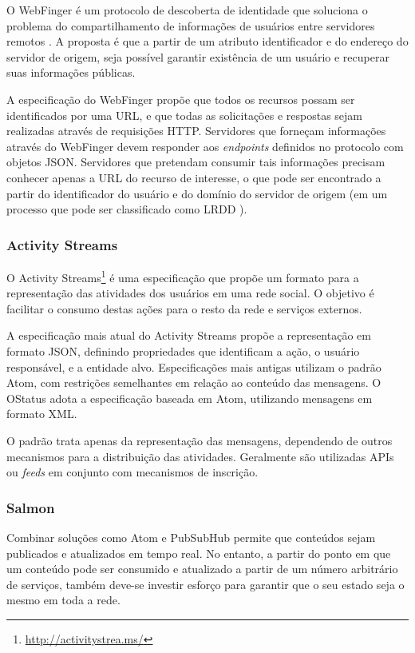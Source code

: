 \begin{sloppypar}
O WebFinger é um protocolo de descoberta de identidade que soluciona o problema do
compartilhamento de informações de usuários entre servidores remotos \cite{rfc7033}.
A proposta é que a partir de um atributo identificador e do endereço do servidor de
origem, seja possível garantir existência de um usuário e recuperar suas informações
públicas.
\end{sloppypar}

A especificação do WebFinger propõe que todos os recursos possam ser identificados
por uma URL, e que todas as solicitações e respostas sejam realizadas através de
requisições HTTP. Servidores que forneçam informações através do WebFinger devem
responder aos \textit{endpoints} definidos no protocolo com objetos JSON. Servidores
que pretendam consumir tais informações precisam conhecer apenas a URL do recurso de
interesse, o que pode ser encontrado a partir do identificador do usuário e do
domínio do servidor de origem (em um processo que pode ser classificado como LRDD
\cite{lrdd2010}). 

\subsubsection{Activity Streams}

O Activity Streams\footnote{\url{http://activitystrea.ms/}} é uma especificação que
propõe um formato para a representação das atividades dos usuários em uma rede
social. O objetivo é facilitar o consumo destas ações para o resto da rede e
serviços externos.

A especificação mais atual do Activity Streams propõe a representação em formato
JSON, definindo propriedades que identificam a ação, o usuário responsável, e a
entidade alvo. Especificações mais antigas utilizam o padrão Atom, com restrições
semelhantes em relação ao conteúdo das mensagens. O OStatus adota a especificação
baseada em Atom, utilizando mensagens em formato XML.

O padrão trata apenas da representação das mensagens, dependendo de outros
mecanismos para a distribuição das atividades. Geralmente são utilizadas APIs ou
\textit{feeds} em conjunto com mecanismos de inscrição.

\subsubsection{Salmon}

Combinar soluções como Atom e PubSubHub permite que conteúdos sejam publicados e
atualizados em tempo real. No entanto, a partir do ponto em que um conteúdo pode ser
consumido e atualizado a partir de um número arbitrário de serviços, também deve-se
investir esforço para garantir que o seu estado seja o mesmo em toda a rede.

